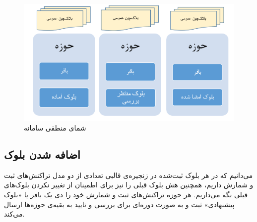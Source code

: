 \begin{figure}[th]
	\centering
	\includegraphics[width=1\linewidth]{blockchain.PNG}
	\caption {شمای منطقی سامانه}
	\label{fig:bigpic}
\end{figure}

\subsection{اضافه شدن بلوک}
می‌دانیم که در هر بلوک ثبت‌شده در زنجیره‌ی قالبی تعدادی از دو مدل تراکنش‌های ثبت و شمارش داریم، همچنین هش بلوک قبلی را نیز برای اطمینان از تغییر نکردن بلوک‌های قبلی نگه ‌می‌داریم. هر حوزه تراکنش‌های ثبت و شمارش خود را دی یک بافر
یا «بلوک پیشنهادی» ثبت و به صورت دوره‌ای برای بررسی و تایید به بقیه‌ی حوزه‌ها ارسال می‌کند. 

